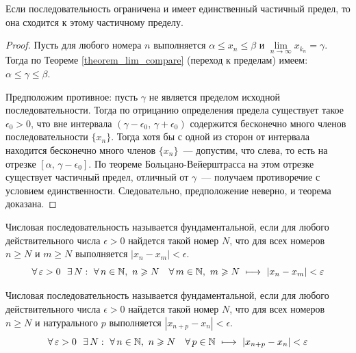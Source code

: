 \begin{theorem}
Если последовательность ограничена и имеет единственный частичный предел,
то она сходится к этому частичному пределу.

\begin{proof}
Пусть для любого номера \(n\) выполняется \(\alpha \leq x_{n} \leq \beta\)
и \(\lim\limits_{n \to \infty}{x_{k_{n}}} = \gamma.\) Тогда по Теореме \ref{theorem_lim_compare}
(переход к пределам) имеем: \(\alpha \leq \gamma \leq \beta.\)

Предположим противное: пусть \(\gamma\) не является пределом исходной последовательности.
Тогда по отрицанию определения предела существует такое \(\epsilon_{0} > 0\),
что вне интервала \((\gamma - \epsilon_{0}, \, \gamma + \epsilon_{0})\) содержится
бесконечно много членов последовательности \(\{x_{n}\}\).
Тогда хотя бы с одной из сторон от интервала находится бесконечно много членов \(\{x_{n}\}\)~---
допустим, что слева, то есть на отрезке \([\alpha, \, \gamma - \epsilon_{0}].\)
По теореме Больцано-Вейерштрасса на этом отрезке существует частичный предел,
отличный от \(\gamma\)~--- получаем противоречие с условием единственности.
Следовательно, предположение неверно, и теорема доказана.
\end{proof}
\end{theorem}


\begin{definition}[Вариант 1]
Числовая последовательность называется фундаментальной, если для любого
действительного числа \(\epsilon > 0\) найдется такой номер \(N\), что
для всех номеров \(n \geq N\) и \(m \geq N\) выполняется \(|x_{n} - x_{m}| < \epsilon\).
\[
\forall \, \varepsilon > 0 ~~ \exists \, N : ~ \forall \, n \in \mathbb{N}, ~ n \geqslant N \hspace{1em}
\forall \, m \in \mathbb{N}, ~ m \geqslant N ~ \longmapsto ~ |x_{n} - x_{m}| < \varepsilon
\]
\end{definition}

\begin{definition}[Вариант 2]
 Числовая последовательность называется фундаментальной, если для любого
действительного числа \(\epsilon > 0\) найдется такой номер \(N\), что
для всех номеров \(n \geq N\) и натурального \(p\) выполняется \(|x_{n+p} - x_{n}| < \epsilon\).
\[
\forall \, \varepsilon > 0 ~~ \exists \, N : ~ \forall \, n \in \mathbb{N}, ~ n \geqslant N \hspace{1em}
\forall \, p \in \mathbb{N} ~ \longmapsto ~ |x_{n+p} - x_{n}| < \varepsilon
\]
\end{definition}

